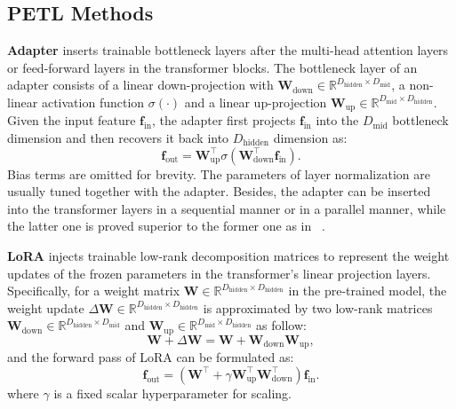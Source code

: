 \documentclass[10pt,twocolumn,letterpaper]{article}
\def\vf{{\bm{f}}}
\def\mW{{\bm{W}}}
\def\sR{{\mathbb{R}}}
\begin{document}
\subsection{PETL Methods}

\noindent\textbf{Adapter} inserts trainable bottleneck layers after the multi-head attention layers or feed-forward layers in the transformer blocks. The bottleneck layer of an adapter consists of a linear down-projection with $\mW_{\text{down}} \in \sR^{D_{\text{hidden}} \times D_{\text{mid}}}$, a non-linear activation function $\sigma(\cdot)$ and a linear up-projection $\mW_{\text{up}} \in \sR^{D_{\text{mid}} \times D_{\text{hidden}}}$.  Given the input feature $\vf_\text{in}$, the adapter first projects $\vf_\text{in}$ into the $D_{\text{mid}}$ bottleneck dimension and then recovers it back into $D_{\text{hidden}}$ dimension as:
\begin{equation}
    \vf_\text{out}= \mW_{\text{up}}^\intercal \sigma(\mW_{\text{down}}^\intercal \vf_\text{in}). \label{con:eq1}
\end{equation}
Bias terms are omitted for brevity.
The parameters of layer normalization are usually tuned together with the adapter.
Besides, the adapter can be inserted into the transformer layers in a sequential manner or in a parallel manner, while the latter one is proved superior to the former one as in ~\cite{unified-petl}.

\noindent\textbf{LoRA} injects trainable low-rank decomposition matrices to represent the weight updates of the frozen parameters in the transformer's linear projection layers. Specifically, for a weight matrix $\mW\in\sR^{D_{\text{hidden}} \times D_{\text{hidden}}}$ in the pre-trained model, the weight update $\Delta\mW\in\sR^{D_{\text{hidden}} \times D_{\text{hidden}}}$ is approximated by two low-rank matrices $\mW_{\text{down}}\in\sR^{D_{\text{hidden}} \times D_{\text{mid}}}$ and $\mW_{\text{up}} \in \sR^{D_{\text{mid}} \times D_{\text{hidden}}}$ as follow:
\begin{equation}
   \mW + \Delta\mW = \mW + \mW_{\text{down}}\mW_{\text{up}} ,
\end{equation}
and the forward pass of LoRA can be formulated as:
\begin{equation}
    \vf_{\text{out}} = (\mW^\intercal + \gamma \mW_{\text{up}}^\intercal \mW_{\text{down}}^\intercal) \vf_{\text{in}}.
\end{equation}
where $\gamma$ is a fixed scalar hyperparameter for scaling.
\end{document}
